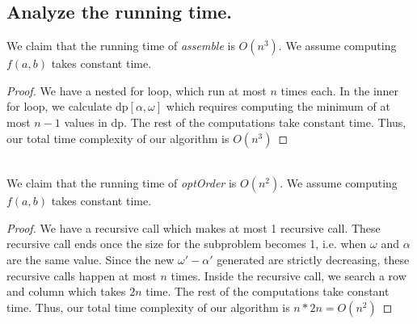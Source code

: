 \documentclass[11pt]{scrartcl}
\begin{document}
\iffalse

\begin{corollary*}
	The algorithm, optOrder, correctly traces the events selected.
	\begin{proof}
		$$\textbf{DO THIS PART }$$
	\end{proof}
\end{corollary*}
\fi

\subsection{
	Analyze the running time.
}
We claim that the running time of \textit{assemble} is $O(n^3)$. 
We assume computing $f(a,b)$ takes constant time.

\begin{proof}
	We have a nested for loop, which run at most $n$ times each.
	In the inner for loop, we calculate dp$[\alpha,\omega]$ which requires computing the minimum of at most $n-1$ values
	in dp. The rest of the computations take constant time.
	Thus, our total time complexity of our algorithm is $O(n^3)$
\end{proof}\-\\
We claim that the running time of \textit{optOrder} is $O(n^2)$. We assume computing $f(a,b)$ takes constant time.
\begin{proof}
	We have a recursive call which makes at most 1 recursive call. These recursive call
	ends once the size for the subproblem becomes 1, i.e. when $\omega$ and $\alpha$ are the same 
	value. Since the new $\omega' - \alpha'$ generated are strictly decreasing, these recursive calls happen at most $n$ times.
	Inside the recursive call, we search a row and column which takes $2n$ time. The rest of the computations take constant time.
	Thus, our total time complexity of our algorithm is $n*2n = O(n^2)$
\end{proof}
\end{document}
